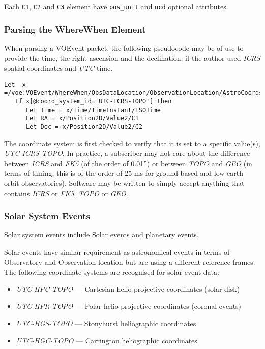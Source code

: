 \documentclass[11pt,a4paper]{ivoa}
\begin{document}
Each \texttt{C1}, \texttt{C2} and \texttt{C3} element have \texttt{pos\_unit} and \texttt{ucd}
optional attributes. 

\subsubsection{Parsing the WhereWhen Element}
\label{sec:3.4.3}
When parsing a VOEvent packet, the following pseudocode may be of use to provide
the time, the right ascension and the declination, if the author used
\emph{ICRS} spatial coordinates and \emph{UTC} time.
\begin{lstlisting}
Let  x =/voe:VOEvent/WhereWhen/ObsDataLocation/ObservationLocation/AstroCoords
   If x[@coord_system_id='UTC-ICRS-TOPO'] then
      Let Time = x/Time/TimeInstant/ISOTime
      Let RA = x/Position2D/Value2/C1
      Let Dec = x/Position2D/Value2/C2
\end{lstlisting}

The coordinate system is first checked to verify that it is set to a specific
value(s), \emph{UTC-ICRS-TOPO}. In practice, a subscriber may not care about the
difference between \emph{ICRS} and \emph{FK5} (of the order of 0.01'') or
between \emph{TOPO} and \emph{GEO} (in terms of timing, this is of the order of
25 ms for ground-based and low-earth-orbit observatories). Software may be
written to simply accept anything that contains \emph{ICRS} or \emph{FK5},
\emph{TOPO} or \emph{GEO}.


\subsubsection{Solar System Events}
\label{sec:3.4.4}
Solar system events include Solar events and planetary events.

Solar events have similar requirement as astronomical events in terms of
Observatory and Observation location but are using a different reference frames.
The following coordinate systems are recognised for solar event data:
\begin{itemize}
\item \emph{UTC-HPC-TOPO} --- Cartesian helio-projective coordinates (solar disk)
\item \emph{UTC-HPR-TOPO} --- Polar helio-projective coordinates (coronal events)
\item \emph{UTC-HGS-TOPO} --- Stonyhurst heliographic coordinates
\item \emph{UTC-HGC-TOPO} --- Carrington heliographic coordinates
\end{itemize}
\end{document}
